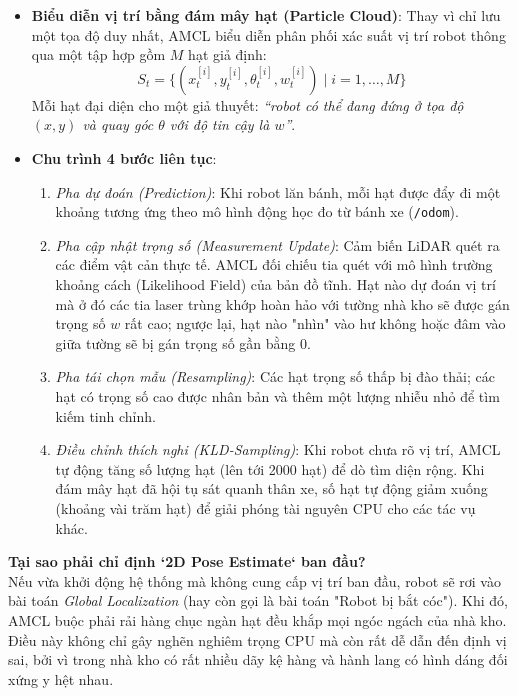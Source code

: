 \documentclass[12pt, a4paper]{article}
\begin{document}
\begin{itemize}
    \item \textbf{Biểu diễn vị trí bằng đám mây hạt (Particle Cloud)}: Thay vì chỉ lưu một tọa độ duy nhất, AMCL biểu diễn phân phối xác suất vị trí robot thông qua một tập hợp gồm $M$ hạt giả định:
    $$S_t = \{ (x_t^{[i]}, y_t^{[i]}, \theta_t^{[i]}, w_t^{[i]}) \mid i = 1, \dots, M \}$$
    Mỗi hạt đại diện cho một giả thuyết: \textit{“robot có thể đang đứng ở tọa độ $(x, y)$ và quay góc $\theta$ với độ tin cậy là $w$”}.
    
    \item \textbf{Chu trình 4 bước liên tục}:
    \begin{enumerate}
        \item \textit{Pha dự đoán (Prediction)}: Khi robot lăn bánh, mỗi hạt được đẩy đi một khoảng tương ứng theo mô hình động học đo từ bánh xe (\texttt{/odom}).
        \item \textit{Pha cập nhật trọng số (Measurement Update)}: Cảm biến LiDAR quét ra các điểm vật cản thực tế. AMCL đối chiếu tia quét với mô hình trường khoảng cách (Likelihood Field) của bản đồ tĩnh. Hạt nào dự đoán vị trí mà ở đó các tia laser trùng khớp hoàn hảo với tường nhà kho sẽ được gán trọng số $w$ rất cao; ngược lại, hạt nào "nhìn" vào hư không hoặc đâm vào giữa tường sẽ bị gán trọng số gần bằng 0.
        \item \textit{Pha tái chọn mẫu (Resampling)}: Các hạt trọng số thấp bị đào thải; các hạt có trọng số cao được nhân bản và thêm một lượng nhiễu nhỏ để tìm kiếm tinh chỉnh.
        \item \textit{Điều chỉnh thích nghi (KLD-Sampling)}: Khi robot chưa rõ vị trí, AMCL tự động tăng số lượng hạt (lên tới 2000 hạt) để dò tìm diện rộng. Khi đám mây hạt đã hội tụ sát quanh thân xe, số hạt tự động giảm xuống (khoảng vài trăm hạt) để giải phóng tài nguyên CPU cho các tác vụ khác.
    \end{enumerate}
\end{itemize}

\textbf{Tại sao phải chỉ định `2D Pose Estimate` ban đầu?}\\
Nếu vừa khởi động hệ thống mà không cung cấp vị trí ban đầu, robot sẽ rơi vào bài toán \textit{Global Localization} (hay còn gọi là bài toán "Robot bị bắt cóc"). Khi đó, AMCL buộc phải rải hàng chục ngàn hạt đều khắp mọi ngóc ngách của nhà kho. Điều này không chỉ gây nghẽn nghiêm trọng CPU mà còn rất dễ dẫn đến định vị sai, bởi vì trong nhà kho có rất nhiều dãy kệ hàng và hành lang có hình dáng đối xứng y hệt nhau.
\end{document}
